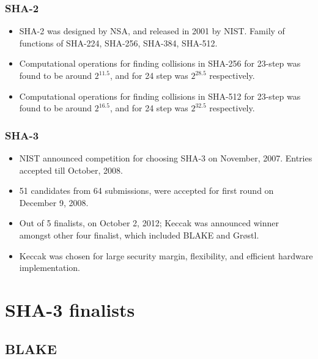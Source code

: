 \documentclass{beamer}
\begin{document}
\begin{frame}
\frametitle{SHA-2}
\begin{itemize}
\item SHA-2 was designed by NSA, and released in 2001 by NIST. Family of functions of SHA-224, SHA-256, 
SHA-384, SHA-512.
\item Computational operations for finding collisions in SHA-256 for 23-step was found to be around 
$2^{11.5}$, and for 24 step was $2^{28.5}$ respectively.
\item Computational operations for finding collisions in SHA-512 for 23-step was found to be around 
$2^{16.5}$, and for 24 step was $2^{32.5}$ respectively\footnotemark.
\end{itemize}
\end{frame}

\begin{frame}
\frametitle{SHA-3}
\begin{itemize}
\item NIST announced competition for choosing SHA-3 on November, 2007. Entries accepted till October, 2008.
\item 51 candidates from 64 submissions, were accepted for first round on December 9, 2008.
\item Out of 5 finalists, on October 2, 2012; Keccak was announced winner amongst other four finalist, which
included BLAKE and Gr{\o}stl.
\item Keccak was chosen for large security margin, flexibility, and efficient hardware implementation.
\end{itemize}
\end{frame}

\section{SHA-3 finalists}

\subsection{BLAKE}
\end{document}
